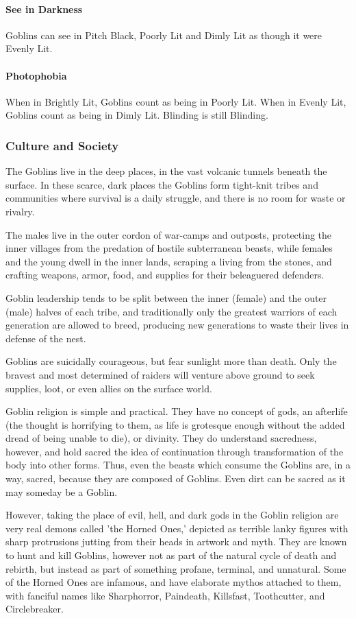 \documentclass[oneside,11pt,english]{book}
\begin{document}
\paragraph{See in Darkness}
Goblins can see in Pitch Black, Poorly Lit and Dimly Lit as though it were Evenly Lit. 
\paragraph{Photophobia}
When in Brightly Lit, Goblins count as being in Poorly Lit. When in Evenly Lit, Goblins count as 
being in Dimly Lit. Blinding is still Blinding. 
\subsubsection*{Culture and Society} 
The Goblins live in the deep places, in the vast volcanic tunnels beneath the surface. In these scarce, dark 
places the Goblins form tight-knit tribes and communities where survival is a daily struggle, and there is 
no room for waste or rivalry. 

 
The males live in the outer cordon of war-camps and outposts, protecting the inner villages from the 
predation of hostile subterranean beasts, while females and the young dwell in the inner lands, scraping a 
living from the stones, and crafting weapons, armor, food, and supplies for their beleaguered defenders. 
 

Goblin leadership tends to be split between the inner (female) and the outer (male) halves of each tribe, 
and traditionally only the greatest warriors of each generation are allowed to breed, producing new 
generations to waste their lives in defense of the nest. 
 

Goblins are suicidally courageous, but fear sunlight more than death. Only the bravest and most 
determined of raiders will venture above ground to seek supplies, loot, or even allies on the surface world. 
 

Goblin religion is simple and practical. They have no concept of gods, an afterlife (the thought is 
horrifying to them, as life is grotesque enough without the added dread of being unable to die), or 
divinity. They do understand sacredness, however, and hold sacred the idea of continuation through 
transformation of the body into other forms. Thus, even the beasts which consume the Goblins are, in a 
way, sacred, because they are composed of Goblins. Even dirt can be sacred as it may someday be a 
Goblin. 

 
However, taking the place of evil, hell, and dark gods in the Goblin religion are very real demons called 
'the Horned Ones,' depicted as terrible lanky figures with sharp protrusions jutting from their heads in 
artwork and myth. They are known to hunt and kill Goblins, however not as part of the natural cycle of 
death and rebirth, but instead as part of something profane, terminal, and unnatural. Some of the Horned 
Ones are infamous, and have elaborate mythos attached to them, with fanciful names like Sharphorror, 
Paindeath, Killsfast, Toothcutter, and Circlebreaker. 
\end{document}
